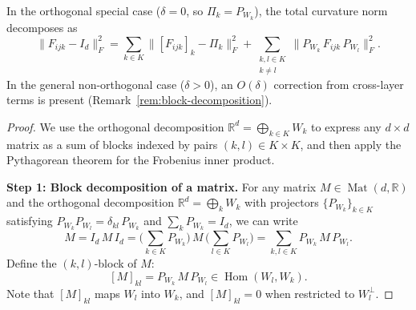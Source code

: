 \begin{proposition}
\label{prop:curvature-block-decomposition-app}
In the orthogonal special case ($\delta = 0$, so $\Pi_k = P_{W_k}$), the total curvature
norm decomposes as
\[
    \|F_{ijk} - I_d\|_F^2 = \sum_{k \in K} \big\|[F_{ijk}]_k - \Pi_k\big\|_F^2
    + \sum_{\substack{k,l \in K \\ k \neq l}} \big\|P_{W_k}\, F_{ijk}\, P_{W_l}\big\|_F^2.
\]
In the general non-orthogonal case ($\delta > 0$), an $O(\delta)$ correction from
cross-layer terms is present (Remark~\ref{rem:block-decomposition}).
\end{proposition}

\begin{proof}
We use the orthogonal decomposition $\mathbb{R}^d = \bigoplus_{k \in K} W_k$ to express
any $d \times d$ matrix as a sum of blocks indexed by pairs $(k, l) \in K \times K$, and
then apply the Pythagorean theorem for the Frobenius inner product.

\medskip\noindent\textbf{Step 1: Block decomposition of a matrix.}
For any matrix $M \in \operatorname{Mat}(d, \mathbb{R})$ and the orthogonal decomposition
$\mathbb{R}^d = \bigoplus_k W_k$ with projectors $\{P_{W_k}\}_{k \in K}$ satisfying
$P_{W_k} P_{W_l} = \delta_{kl}\, P_{W_k}$ and $\sum_k P_{W_k} = I_d$, we can write
\[
    M = I_d\, M\, I_d = \Big(\sum_{k \in K} P_{W_k}\Big)\, M\,
    \Big(\sum_{l \in K} P_{W_l}\Big) = \sum_{k, l \in K} P_{W_k}\, M\, P_{W_l}.
\]
Define the $(k, l)$-block of $M$:
\[
    [M]_{kl} = P_{W_k}\, M\, P_{W_l} \in \operatorname{Hom}(W_l, W_k).
\]
Note that $[M]_{kl}$ maps $W_l$ into $W_k$, and $[M]_{kl} = 0$ when restricted to
$W_l^\perp$.


\end{proof}
